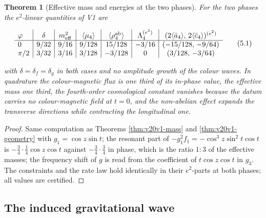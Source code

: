 \documentclass[11pt]{article}
\newtheorem{theorem}{Theorem}[section]
\theoremstyle{remark}
\begin{document}
\begin{theorem}[Effective mass and energies at the two phases]
\label{thm:v20v2-phase}
For the two phases the \(e^2\)-linear quantities of V1 are

\[
\begin{array}{l|c|c|c|c|c|c}
\varphi&\delta&m_{\rm eff}^2&\langle\mu_4\rangle&\langle\rho^{\rm ab}_4\rangle&\Lambda_4^{(e^2)}&(2\langle\ddot a_4\rangle,\,2\langle\ddot c_4\rangle)^{(e^2)}\\ \hline
0&9/32&9/16&9/128&15/128&-3/16&(-15/128,\,-9/64)\\
\pi/2&3/32&3/16&3/128&-3/128&0&(3/128,\,-3/64)
\end{array}                                                            \tag{5.1}
\]

with \(\delta=\delta_f=\delta_g\) in both cases and no amplitude growth
of the colour waves.  In quadrature the colour-magnetic flux is one
third of its in-phase value, the effective mass one third, the
fourth-order cosmological constant vanishes because the datum carries
no colour-magnetic field at \(t=0\), and the non-abelian effect
expands the transverse directions while contracting the longitudinal
one.
\end{theorem}

\begin{proof}
Same computation as Theorems \ref{thm:v20v1-mass} and
\ref{thm:v20v1-geometry} with \(g_1=\cos z\sin t\); the resonant part
of \(-g_1^2f_1=-\cos^3z\sin^2t\cos t\) is \(-\tfrac34\cdot\tfrac14\cos z\cos t\)
against \(-\tfrac34\cdot\tfrac34\) in phase, which is the ratio \(1:3\)
of the effective masses; the frequency shift of \(g\) is read from the
coefficient of \(t\cos z\cos t\) in \(g_3\).  The constraints and the
rate law hold identically in their \(e^2\)-parts at both phases; all
values are certified.
\end{proof}

\subsection{The induced gravitational wave}
\end{document}
